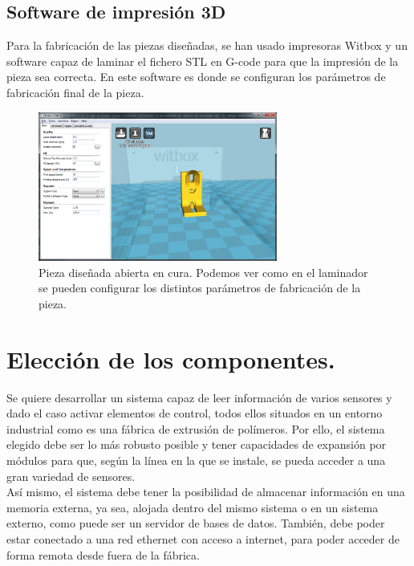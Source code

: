 \subsection{Software de impresión 3D}
Para la fabricación de las piezas diseñadas, se han usado impresoras Witbox y un software capaz de laminar el fichero STL en G-code para que la impresión de la pieza sea correcta. En este software es donde se configuran los parámetros de fabricación final de la pieza.

\begin{figure}[H]
    \centering
    \includegraphics[width=0.7\textwidth]{images/cura.png}
    \caption[Pieza diseñada abierta en cura.]{Pieza diseñada abierta en cura. Podemos ver como en el laminador se pueden configurar los distintos parámetros de fabricación de la pieza.}
    \label{fig:cura}
\end{figure}


\section{Elección de los componentes.}

Se quiere desarrollar un sistema capaz de leer información de varios sensores y dado el caso activar elementos de control, todos ellos situados en un entorno industrial como es una fábrica de extrusión de polímeros. Por ello, el sistema elegido debe ser lo más robusto posible y tener capacidades de expansión por módulos para que, según la línea en la que se instale, se pueda acceder a una gran variedad de sensores.\\ 

Así mismo, el sistema debe tener la posibilidad de almacenar información en una memoria externa, ya sea, alojada dentro del mismo sistema o en un sistema externo, como puede ser un servidor de bases de datos. También, debe poder estar conectado a una red ethernet con acceso a internet, para poder acceder de forma remota desde fuera de la fábrica.\\ 

